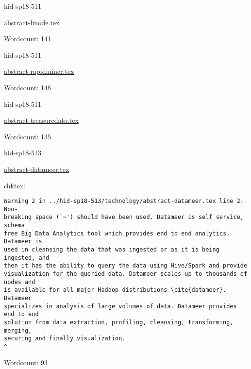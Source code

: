 

\begin{IU}

hid-sp18-511

\href{https://github.com/cloudmesh-community/hid-sp18-511/blob/master//technology/abstract-linode.tex}{abstract-linode.tex}

 

Wordcount: 141

\end{IU}



\begin{IU}

hid-sp18-511

\href{https://github.com/cloudmesh-community/hid-sp18-511/blob/master//technology/abstract-rapidminer.tex}{abstract-rapidminer.tex}

 

Wordcount: 148

\end{IU}



\begin{IU}

hid-sp18-511

\href{https://github.com/cloudmesh-community/hid-sp18-511/blob/master//technology/abstract-treasuredata.tex}{abstract-treasuredata.tex}

 

Wordcount: 135

\end{IU}



\begin{IU}

hid-sp18-513

\href{https://github.com/cloudmesh-community/hid-sp18-513/blob/master//technology/abstract-datameer.tex}{abstract-datameer.tex}

 
chktex:
\begin{tiny}
\begin{verbatim}
Warning 2 in ../hid-sp18-513/technology/abstract-datameer.tex line 2: Non-
breaking space (`~') should have been used. Datameer is self service, schema
free Big Data Analytics tool which provides end to end analytics. Datameer is
used in cleansing the data that was ingested or as it is being ingested, and
then it has the ability to query the data using Hive/Spark and provide
visualization for the queried data. Datameer scales up to thousands of nodes and
is available for all major Hadoop distributions \cite{datameer}. Datameer
specializes in analysis of large volumes of data. Datameer provides end to end
solution from data extraction, profiling, cleansing, transforming, merging,
securing and finally visualization.
^
\end{verbatim}
\end{tiny}

Wordcount: 93

\end{IU}

